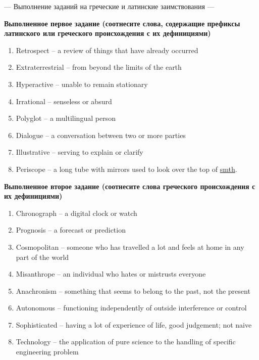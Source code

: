 \documentclass[main.tex]{subfiles}
\begin{document}


--- Выполнение заданий на греческие и латинские заимствования ---
\vspace{7pt}

\textbf{Выполненное первое задание (соотнесите слова, содержащие префиксы латинского или греческого происхождения с их дефинициями)}

\begin{enumerate}[nosep]
	\itemsep\eitsp
	\item Retrospect -- a review of things that have already occurred
	\item Extraterrestrial -- from beyond the limits of the earth
	\item Hyperactive -- unable to remain stationary
	\item Irrational -- senseless or absurd
	\item Polyglot -- a multilingual person
	\item Dialogue -- a conversation between two or more parties
	\item Illustrative -- serving to explain or clarify
	\item Periscope -- a long tube with mirrors used to look over the top of \underline{smth}.
\end{enumerate}
\vspace{5pt}

\textbf{Выполненное второе задание (соотнесите слова греческого происхождения с их дефинициями)}

\begin{enumerate}[nosep]
	\itemsep\eitsp
	\item Chronograph -- a digital clock or watch
	\item Prognosis -- a forecast or prediction
	\item Cosmopolitan -- someone who has travelled a lot and feels at home in any part of the world
	\item Misanthrope -- an individual who hates or mistrusts everyone
	\item Anachronism -- something that seems to belong to the past, not the present
	\item Autonomous -- functioning independently of outside interference or control
	\item Sophisticated -- having a lot of experience of life, good judgement; not naive
	\item Technology -- the application of pure science to the handling of specific engineering problem
\end{enumerate}
\vspace{7pt}
\end{document}

